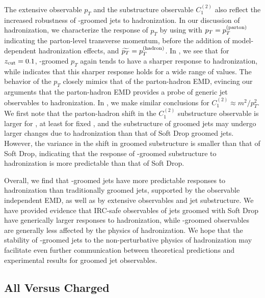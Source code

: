 The extensive observable \(p_T\) and the substructure observable \(C_1^{(2)}\) also reflect the increased robustness of \PIRANHA{}-groomed jets to \gls{hadronization}.
%
In our discussion of \gls{hadronization}, we characterize the response of \(p_T\) by using  with \(p_T = p_T^{\rm(parton)}\) indicating the parton-level transverse momentum, before the addition of model-dependent \gls{hadronization} effects, and \(\widetilde{p_T} = p_T^{\rm(hadron)}\).
%
In , we see that for \(z_{\rm cut} = 0.1\), \PIRANHA{}-groomed \(p_T\) again tends to have a sharper response to \gls{hadronization}, while  indicates that this sharper response holds for a wide range of \zcut{} values.
%
The behavior of the \(p_T\) closely mimics that of the parton-hadron EMD, evincing our arguments that the parton-hadron EMD provides a probe of generic jet observables to \gls{hadronization}.
%
In , we make similar conclusions for \(C_1^{(2)} \approx m^2 / p_T^2\).
%
We first note that the parton-hadron shift in the \(C_1^{(2)}\) substructure observable is larger for , at least for fixed \zcut{}, and the substructure of  groomed jets may undergo larger changes due to \gls{hadronization} than that of Soft Drop groomed jets.
%
However, the variance in the shift in  groomed substructure is smaller than that of Soft Drop, indicating that the response of \PIRANHA{}-groomed substructure to \gls{hadronization} is more predictable than that of Soft Drop.

Overall, we find that \PIRANHA{}-groomed jets have more predictable responses to \gls{hadronization} than traditionally groomed jets, supported by the observable independent EMD, as well as by extensive observables and jet substructure.
%
We have provided evidence that IRC-safe observables of jets groomed with Soft Drop have generically larger responses to \gls{hadronization}, while \PIRANHA{}-groomed observables are generally less affected by the physics of \gls{hadronization}.
%
We hope that the stability of \PIRANHA{}-groomed jets to the non-perturbative physics of \gls{hadronization} may facilitate even further communication between theoretical predictions and experimental results for groomed jet observables.

\subsection{All Versus Charged}
\label{sec:pira-neutral}


